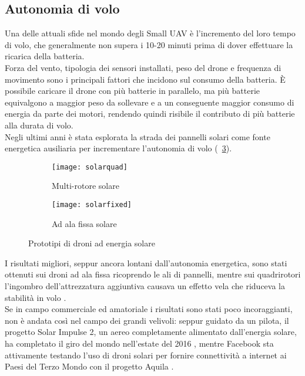 \subsection[Autonomia di volo]{Autonomia di volo} \label{sect:autonomia}
Una delle attuali sfide nel mondo degli Small UAV è l'incremento del loro tempo di volo, che generalmente non supera i 10-20 minuti prima di dover effettuare la ricarica della batteria. \\
Forza del vento, tipologia dei sensori installati, peso del drone e frequenza di movimento sono i principali fattori che incidono sul consumo della batteria. 
È possibile caricare il drone con più batterie in parallelo, ma più batterie equivalgono a maggior peso da sollevare e a un conseguente maggior consumo di energia da parte dei motori, rendendo quindi risibile il contributo di più batterie alla durata di volo.\\
Negli ultimi anni è stata esplorata la strada dei pannelli solari come fonte energetica ausiliaria per incrementare l'autonomia di volo (\figurename\ \ref{fig:solar}). 
%
\begin{figure}
	\centering
	\begin{subfigure}[b]{0.4\textwidth}
		\centering
		\texttt{[image: solarquad]}
		\caption{Multi-rotore solare}
		\label{fig:solarquad}
	\end{subfigure}
	\begin{subfigure}[b]{0.4\textwidth}
		\centering
		\texttt{[image: solarfixed]}
		\caption{Ad ala fissa solare}
		\label{fig:solarfixed}
	\end{subfigure}
	\caption{Prototipi di droni ad energia solare}
	\label{fig:solar}
\end{figure}
%
I risultati migliori, seppur ancora lontani dall'autonomia energetica, sono stati ottenuti sui droni ad ala fissa \cite{newatlas} ricoprendo le ali di pannelli, mentre sui quadrirotori l'ingombro dell'attrezzatura aggiuntiva causava un effetto vela che riduceva la stabilità in volo \cite{diydrones}.\\ Se in campo commerciale ed amatoriale i risultati sono stati poco incoraggianti, non è andata così nel campo dei grandi velivoli: seppur guidato da un pilota, il progetto Solar Impulse 2, un aereo completamente alimentato dall'energia solare, ha completato il giro del mondo nell'estate del 2016 \cite{theguardian}, mentre Facebook sta attivamente testando l'uso di droni solari per fornire connettività a internet ai Paesi del Terzo Mondo con il progetto Aquila \cite{fbaquila}.\\

